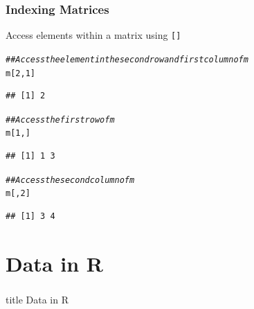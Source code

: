 \documentclass{beamer}\usepackage[]{graphicx}\usepackage[]{color}
\makeatletter
\newcommand{\hlnum}[1]{\textcolor[rgb]{0.686,0.059,0.569}{#1}}%
\newcommand{\hlcom}[1]{\textcolor[rgb]{0.678,0.584,0.686}{\textit{#1}}}%
\newcommand{\hlstd}[1]{\textcolor[rgb]{0.345,0.345,0.345}{#1}}%
\newenvironment{kframe}{%
 \def\at@end@of@kframe{}%
 \ifinner\ifhmode%
  \def\at@end@of@kframe{\end{minipage}}%
  \begin{minipage}{\columnwidth}%
 \fi\fi%
 \def\FrameCommand##1{\hskip\@totalleftmargin \hskip-\fboxsep
 \colorbox{shadecolor}{##1}\hskip-\fboxsep
     \hskip-\linewidth \hskip-\@totalleftmargin \hskip\columnwidth}%
 \MakeFramed {\advance\hsize-\width
   \@totalleftmargin\z@ \linewidth\hsize
   \@setminipage}}%
 {\par\unskip\endMakeFramed%
 \at@end@of@kframe}
\newenvironment{knitrout}{}{} %
\makeatother
\begin{document}
\begin{frame}[fragile]\frametitle{Indexing Matrices}
    Access elements within a matrix using \texttt{[]}
\begin{knitrout}\footnotesize
{}\color{fgcolor}\begin{kframe}
\begin{alltt}
\hlcom{## Access the element in the second row and first column of m}
\hlstd{m[}\hlnum{2}\hlstd{,} \hlnum{1}\hlstd{]}
\end{alltt}
\begin{verbatim}
## [1] 2
\end{verbatim}
\begin{alltt}
\hlcom{## Access the first row of m}
\hlstd{m[}\hlnum{1}\hlstd{, ]}
\end{alltt}
\begin{verbatim}
## [1] 1 3
\end{verbatim}
\begin{alltt}
\hlcom{## Access the second column of m}
\hlstd{m[,} \hlnum{2}\hlstd{]}
\end{alltt}
\begin{verbatim}
## [1] 3 4
\end{verbatim}
\end{kframe}
\end{knitrout}
\end{frame}

\section{Data in R}
\label{data}
\begin{frame}\frametitle{}
    \vfill
    \centering
    \begin{beamercolorbox}[center]{title}
        \Large Data in R
    \end{beamercolorbox}
    \vfill
\end{frame}
\end{document}
